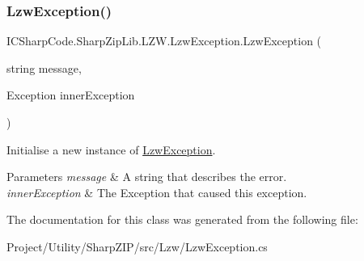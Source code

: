 \subsubsection{\texorpdfstring{Lzw\+Exception()}{LzwException()}\hspace{0.1cm}{\footnotesize\ttfamily [4/4]}}
{\footnotesize\ttfamily I\+C\+Sharp\+Code.\+Sharp\+Zip\+Lib.\+L\+Z\+W.\+Lzw\+Exception.\+Lzw\+Exception (\begin{DoxyParamCaption}\item[{string}]{message,  }\item[{Exception}]{inner\+Exception }\end{DoxyParamCaption})\hspace{0.3cm}{\ttfamily [inline]}}



Initialise a new instance of \hyperlink{class_i_c_sharp_code_1_1_sharp_zip_lib_1_1_l_z_w_1_1_lzw_exception}{Lzw\+Exception}. 


\begin{DoxyParams}{Parameters}
{\em message} & A string that describes the error.\\
\hline
{\em inner\+Exception} & The Exception that caused this exception.\\
\hline
\end{DoxyParams}


The documentation for this class was generated from the following file\+:\begin{DoxyCompactItemize}
\item 
Project/\+Utility/\+Sharp\+Z\+I\+P/src/\+Lzw/Lzw\+Exception.\+cs\end{DoxyCompactItemize}
